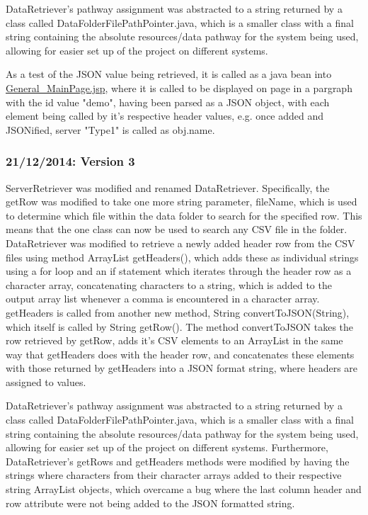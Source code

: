 DataRetriever's pathway assignment was abstracted to a string returned by a class called DataFolderFilePathPointer.java, which is a smaller class with a final string containing the absolute resources/data pathway for the system being used, allowing for easier set up of the project on different systems. 

As a test of the JSON value being retrieved, it is called as a java bean into \url{General_MainPage.jsp}, where it is called to be displayed on page in a pargraph with the id value "demo", having been parsed as a JSON object, with each element being called by it's respective header values, e.g. once added and JSONified, server "Type1" is called as obj.name.

\subsubsection{21/12/2014: Version 3}
\label{subSubSection:Java and JSON: Lab 3}
ServerRetriever was modified and renamed DataRetriever. Specifically, the getRow was modified to take one more string parameter, fileName, which is used to determine which file within the data folder to search for the specified row. This means that the one class can now be used to search any CSV file in the folder. 
DataRetriever was modified to retrieve a newly added header row from the CSV files using method ArrayList getHeaders(), which adds these as individual strings using a for loop and an if statement which iterates through the header row as a character array, concatenating characters to a string, which is added to the output array list whenever a comma is encountered in a character array. 
getHeaders is called from another new method, String convertToJSON(String), which itself is called by String getRow(). The method convertToJSON takes the row retrieved by getRow, adds it's CSV elements to an ArrayList in the same way that getHeaders does with the header row, and concatenates these elements with those returned by getHeaders into a JSON format string, where headers are assigned to values. 

DataRetriever's pathway assignment was abstracted to a string returned by a class called DataFolderFilePathPointer.java, which is a smaller class with a final string containing the absolute resources/data pathway for the system being used, allowing for easier set up of the project on different systems. 
Furthermore, DataRetriever's getRows and getHeaders methods were modified by having the strings where characters from their character arrays added to their respective string ArrayList objects, which overcame a bug where the last column header and row attribute were not being added to the JSON formatted string. 

